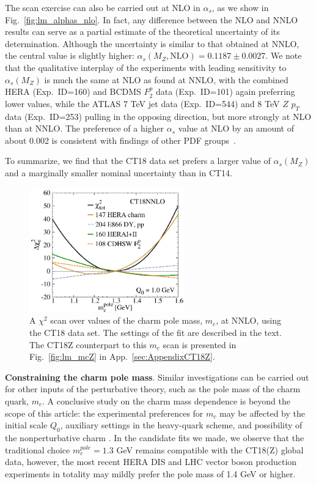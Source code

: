 The scan exercise can also be carried out at NLO in $\alpha_s$, as we show in Fig.~\ref{fig:lm_alphas_nlo}. In fact, any difference between the NLO and NNLO results can serve as a partial estimate of the
theoretical uncertainty of its determination. Although the uncertainty is similar to that obtained at NNLO, the central value is slightly higher: $\alpha_s(M_Z,\mbox{NLO})=0.1187\pm 0.0027$. We note that the qualitative interplay of the experiments with leading sensitivity to $\alpha_s(M_Z)$ is much the same at NLO as
found at NNLO, with the combined HERA (Exp.~ID=160) and BCDMS $F^p_2$ data (Exp.~ID=101) again preferring lower values, while the ATLAS 7 TeV jet data (Exp.~ID=544) and 8 TeV
$Z$ $p_T$ data (Exp.~ID=253) pulling in the opposing direction, but more strongly at NLO than at NNLO. The preference of a higher $\alpha_s$ value at NLO by an amount of about 0.002 is consistent with findings of other PDF groups~\cite{Ball:2011us,Harland-Lang:2015nxa,Abramowicz:2015mha,Alekhin:2017kpj}.


To summarize, we find that the CT18 data set prefers a larger value of $\alpha_{s}(M_Z)$ and a marginally smaller nominal uncertainty than in CT14.


%
\begin{figure}[tbp]
\centering
\includegraphics[width=0.6\textwidth]{./fig/LM/i2Tn3Q01-00mc1-30_DEchi2_re_ect.pdf}
\caption{
	A $\chi^2$ scan over values of the charm pole mass, $m_c$, at NNLO, using the CT18 data set. The settings of the fit are described in the text. The CT18Z counterpart to this $m_c$ scan is presented in Fig.~\ref{fig:lm_mcZ} in App.~\ref{sec:AppendixCT18Z}.
        }
\label{fig:lm_mc}
\end{figure}
%

{\bf Constraining the charm pole mass}.
Similar investigations can be carried out for other inputs of the perturbative theory, such as the pole mass of the charm
quark, $m_c$. A conclusive study on the charm mass dependence is beyond the scope of this article: the experimental preferences for $m_c$ may be affected by the initial scale $Q_0$, auxiliary settings in the heavy-quark scheme, and possibility of the nonperturbative charm \cite{Gao:2013wwa,Hou:2017khm,Dulat:2013hea}. In the candidate fits we made, we observe that the traditional choice $m_c^{pole}=1.3$ GeV remains compatible with the CT18(Z) global data, however, the most recent HERA DIS and LHC vector boson production experiments in totality may mildly prefer the pole mass of 1.4 GeV or higher. 


